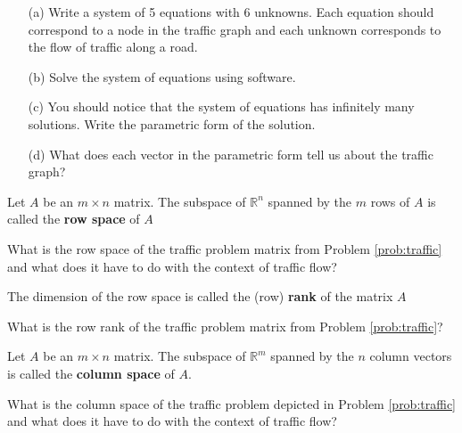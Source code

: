 \begin{problem}
\begin{center}
    \end{center}
    \begin{enumerate}
        \item[(a)] Write a system of 5 equations with 6 unknowns.  Each equation should
            correspond to a node in the traffic graph and each unknown corresponds to the
            flow of traffic along a road.
        \item[(b)] Solve the system of equations using software.
        \item[(c)] You should notice that the system of equations has infinitely many
            solutions.  Write the parametric form of the solution.
        \item[(d)] What does each vector in the parametric form tell us about the traffic
            graph?
    \end{enumerate}
\end{problem}



\begin{definition}
        Let $A$ be an $m \times n$ matrix. The subspace of $\mathbb{R}^n$ spanned by the
        $m$ rows of $A$ is called the {\bf row space} of $A$
\end{definition}

\begin{problem}
    What is the row space of the traffic problem matrix from Problem \ref{prob:traffic}
    and what does it have to do with the context of traffic flow?
\end{problem}

\begin{definition}
    The dimension of the row space is called the (row) {\bf rank} of the matrix $A$
\end{definition}

\begin{problem}
    What is the row rank of the traffic problem matrix from Problem \ref{prob:traffic}?
\end{problem}

\begin{definition}
        Let $A$ be an $m \times n$ matrix. The subspace of $\mathbb{R}^m$ spanned by the
        $n$ column vectors is called the {\bf column space} of $A$.
\end{definition}
\begin{problem}
    What is the column space of the traffic problem depicted in Problem \ref{prob:traffic}
    and what does it have to do with the context of traffic flow?
\end{problem}

